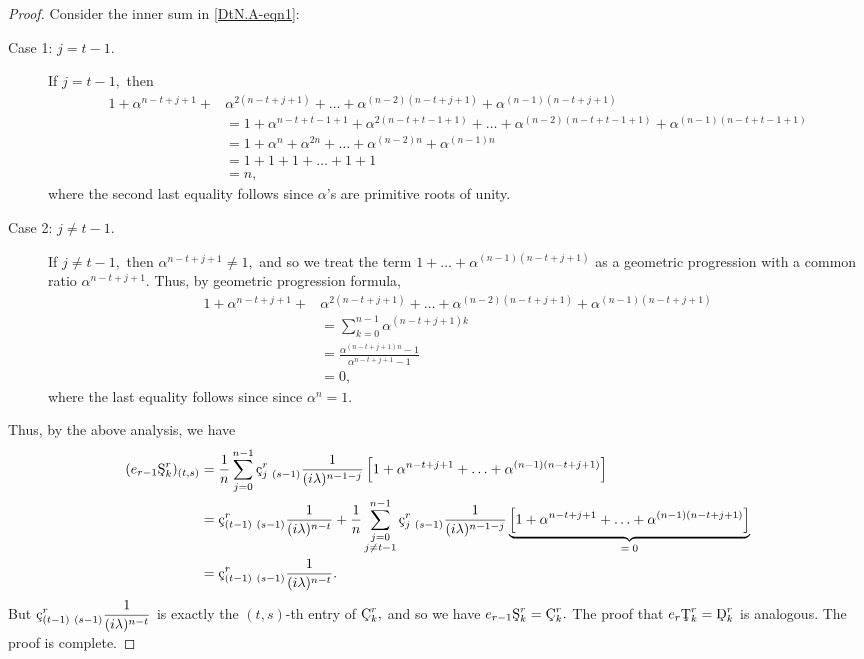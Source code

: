 \documentclass[10pt,reqno,oneside,a4paper]{article}
\begin{document}
\begin{proof}
Consider the inner sum in \eqref{DtN.A-eqn1}:
\begin{description}
   \item[Case 1: $j = t-1.$]
   If $j = t-1,$ then
   \begin{align*}
   1 + \alpha^{n-t+j+1} + &\alpha^{2(n-t+j+1)}+ \ldots + \alpha^{(n-2)(n-t+j+1)}+ \alpha^{(n-1)(n-t+j+1)}  \\
    &= 1 + \alpha^{n - t + t -1  + 1} + \alpha^{2(n-t+ t - 1 +1)} + \ldots +\alpha^{(n-2)(n-t+ t - 1 +1)} + \alpha^{(n-1)(n-t+ t - 1+1)}  \\
    &= 1 + \alpha^{n} + \alpha^{2n} + \ldots +\alpha^{(n-2)n} + \alpha^{(n-1)n} \\
    &= 1 + 1 + 1 + \ldots + 1 + 1 \\
    &= n,
   \end{align*}
   where the second last equality follows since $\alpha$'s are primitive roots of unity.
   \item[Case 2: $j \neq t-1.$]
   If  $j \neq t-1,$ then $\alpha^{n-t+j + 1} \neq 1,$ and so we treat the term $1 + \ldots +  \alpha^{(n-1)(n-t+j+1)}$ as a geometric progression with a common ratio $\alpha^{n-t+j + 1}.$ Thus, by geometric progression formula, 
   \begin{align*}
   1 + \alpha^{n-t+j+1} + &\alpha^{2(n-t+j+1)}+ \ldots + \alpha^{(n-2)(n-t+j+1)}+ \alpha^{(n-1)(n-t+j+1)}  \\
    &= \sum^{n-1}_{k=0} \alpha^{(n-t+j+1)k} \\
    &= \frac{\alpha^{(n-t+j+1)n} - 1}{\alpha^{n-t+j+1} -1} \\
    &= 0, 
   \end{align*}
   where the last equality follows since since $\alpha^n = 1.$
\end{description}
Thus, by the above analysis, we have 
\begin{align*}
(e_{r-1}\textup{\c{S}}^r_k)_{(t,s)} &= \frac{1}{n}  \sum^{n-1}_{j=0} \textup{\c{c}}_{j~ (s-1)}^r \frac{1}{(i\lambda)^{n-1-j}} \left[ 1 + \alpha^{n-t+j+1} + \ldots + \alpha^{(n-1)(n-t+j+1)}  \right] \\
&= \textup{\c{c}}_{(t-1)~ (s-1)}^r \frac{1}{(i\lambda)^{n-t}} + \frac{1}{n}  \sum^{n-1}_{\substack{j=0 \\ j \neq t-1}} \textup{\c{c}}_{j~ (s-1)}^r \frac{1}{(i\lambda)^{n-1-j}} \underbrace{\left[ 1 + \alpha^{n-t+j+1} + \ldots + \alpha^{(n-1)(n-t+j+1)}  \right]}_\text{$=0$} \\
&= \textup{\c{c}}_{(t-1)~ (s-1)}^r \frac{1}{(i\lambda)^{n-t}}.
\end{align*}
But $\displaystyle\textup{\c{c}}_{(t-1)~ (s-1)}^r \frac{1}{(i\lambda)^{n-t}}$ is exactly the $(t,s)$-th entry of $\textup{\c{C}}^r_k,$ and so we have $e_{r-1}\textup{\c{S}}^r_k = \textup{\c{C}}^r_k.$ The proof that $e_{r}\textup{\c{T}}^r_k = \textup{\c{D}}^r_k$ is analogous. The proof is complete.
\end{proof}
\end{document}
